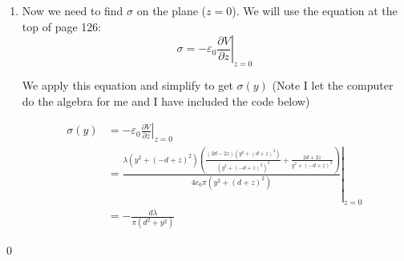 \documentclass{homework}
\newcommand\ve{\varepsilon}
\newcommand{\fracpd}[2]{
    \ensuremath{\frac{\partial #1}{\partial #2}}
  }
\begin{document}
\begin{homeworkProblem}[Problem 3.10]
{\begin{enumerate}
        \begin{align*}
          V(y, z) = \frac{\lambda}{4 \pi \ve_0} ln \left( \frac{y^2 + (z + d)^2}{y^2 + (z -d)^2} \right)
        \end{align*}
      \item Now we need to find $\sigma$ on the plane ($z=0$). We will use the equation at the top of page 126: $$\sigma = - \ve_0 \left. \fracpd{V}{z} \right|_{z=0}$$

      We apply this equation and simplify to get $\sigma(y)$ (Note I let the computer do the algebra for me and I have included the code below)

      \begin{align*}
        \sigma(y) &= - \ve_0 \left. \fracpd{V}{z} \right|_{z=0} \\
          &= \left. \frac{\lambda \left(y^{2} + \left(- d + z\right)^{2}\right) \left(\frac{\left(2 d - 2 z\right) \left(y^{2} + \left(d + z\right)^{2}\right)}{\left(y^{2} + \left(- d + z\right)^{2}\right)^{2}} + \frac{2 d + 2 z}{y^{2} + \left(- d + z\right)^{2}}\right)}{4 e_{0} \pi \left(y^{2} + \left(d + z\right)^{2}\right)} \right|_{z=0} \\
          &=  - \frac{d \lambda}{\pi \left(d^{2} + y^{2}\right)}
      \end{align*}
    \end{enumerate}
      
    \qed
  }
\end{homeworkProblem}
\end{document}
